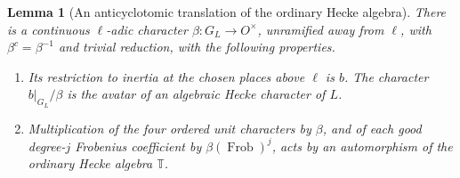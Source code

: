\documentclass[a4paper,11pt]{article}
\newtheorem{lemma}[proposition]{Lemma}
\theoremstyle{definition}
\theoremstyle{remark}
\numberwithin{equation}{section}
\begin{document}
\begin{lemma}[An anticyclotomic translation of the ordinary Hecke algebra]
\leavevmode\label{lem:halftwist596}
There is a continuous \(\ell\)-adic character
\(\beta:G_L\to O^\times\), unramified away from \(\ell\),
with \(\beta^c=\beta^{-1}\) and trivial reduction, with
the following properties.
\begin{enumerate}
\item Its restriction to inertia at the chosen places above
\(\ell\) is \(b\). The character \(b|_{G_L}/\beta\) is the
avatar of an algebraic Hecke character of \(L\).
\item Multiplication of the four ordered unit characters
by \(\beta\), and of each good degree-\(j\) Frobenius
coefficient by \(\beta(\operatorname{Frob})^j\), acts by
an automorphism of the ordinary Hecke algebra \(\mathbb T\).
\end{enumerate}
\end{lemma}
\end{document}
